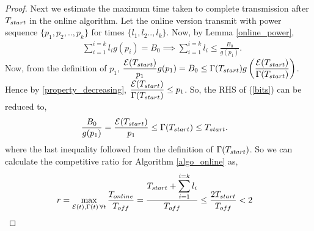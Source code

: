 \begin{proof}
Next we estimate the maximum time taken to complete transmission after $T_{\mbox{\scriptsize{start}}}$ in the online algorithm. Let the online version transmit with power sequence $\{p_1,p_2,..,p_k\}$ for times $\{l_1,l_2..,l_k\} $. Now, by Lemma \ref{online_power},
\begin{align}
&\sum_{i=1}^{i=k}l_ig(p_i)=B_0\implies\sum_{i=1}^{i=k}l_i\le \frac{B_0}{g(p_1)}.\label{bits}
\end{align}
Now, from the definition of $p_1$, $\dfrac{\ETx(T_{\mbox{\scriptsize{start}}})}{p_1}g(p_1)=B_0 \le \TRx(T_{\mbox{\scriptsize{start}}}) g\left( \dfrac{\ETx(T_{\mbox{\scriptsize{start}}})}{\TRx(T_{\mbox{\scriptsize{start}}})} \right)$. Hence by \eqref{property_decreasing}, $\dfrac{\ETx(T_{\mbox{\scriptsize{start}}})}{\TRx(T_{\mbox{\scriptsize{start}}})}\le p_1$.\vspace{2pt}
So, the RHS of (\ref{bits}) can be reduced to, 
\begin{align}
&\frac{B_0}{g(p_1)} = \frac{\ETx(T_{\mbox{\scriptsize{start}}})}{p_1} \le \TRx(T_{\mbox{\scriptsize{start}}})\le T_{\mbox{\scriptsize{start}}}.
\end{align}
where the last inequality followed from the definition of $\TRx(T_{\mbox{\scriptsize{start}}})$. So we can calculate the competitive ratio for Algorithm \ref{algo_online} as,
\begin{align*}
&r=\displaystyle\max_{\ETx(t),\TRx(t)\hspace{0.5mm} \forall t}\dfrac{T_{\mbox{\scriptsize{online}}}}{T_{\mbox{\scriptsize{off}}}} = \dfrac{T_{\mbox{\scriptsize{start}}}+\displaystyle\sum_{i=1}^{i=k}l_i}{T_{\mbox{\scriptsize{off}}}} \le \dfrac{2 T_{\mbox{\scriptsize{start}}}}{T_{\mbox{\scriptsize{off}}}} < 2
\end{align*}
\end{proof}
